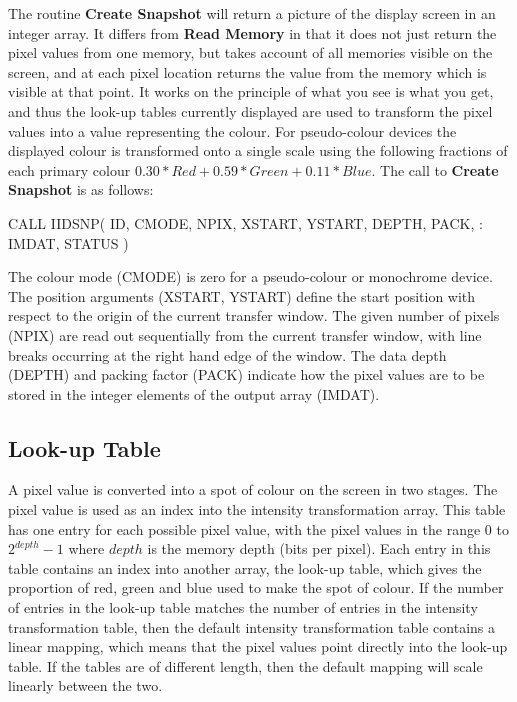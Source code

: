 \documentclass[11pt,nolof]{starlink}
\begin{document}
The routine \textbf{Create Snapshot} will return a picture of the display
screen in an integer array. It differs from \textbf{Read Memory} in that it
does not just return the pixel values from one memory, but takes account
of all memories visible on the screen, and at each pixel location returns
the value from the memory which is visible at that point. It works on the
principle of what you see is what you get, and thus the look-up tables
currently displayed are used to transform the pixel values into a value
representing the colour. For pseudo-colour devices the displayed colour
is transformed onto a single scale using the following fractions of each
primary colour $ 0.30 * Red + 0.59 * Green + 0.11 * Blue $.
The call to \textbf{Create Snapshot} is as follows:
\begin{small}
\begin{terminalv}
      CALL IIDSNP( ID, CMODE, NPIX, XSTART, YSTART, DEPTH, PACK,
     :             IMDAT, STATUS )
\end{terminalv}
\end{small}
The colour mode (CMODE) is zero for a pseudo-colour or monochrome device.
The position arguments (XSTART, YSTART) define the start position
with respect to the origin of the current transfer window.
The given number of pixels (NPIX) are read out sequentially
from the current transfer window, with line breaks occurring at the
right hand edge of the window.
The data depth (DEPTH) and packing factor (PACK) indicate how
the pixel values are to be stored in the integer elements of the output
array (IMDAT).

\subsection{Look-up Table}

A pixel value is converted into a spot of colour on the screen in two
stages. The pixel value is used as an index into the intensity
transformation array. This table has one entry for each possible
pixel value, with the pixel values in the range 0 to $2^{depth}-1$
where $depth$ is the memory depth (bits per pixel). Each entry in
this table contains an index into another array, the look-up table,
which gives the proportion of red, green and blue used to make the
spot of colour. If the number of entries in the look-up table matches
the number of entries in the intensity transformation table, then the
default intensity transformation table contains a linear mapping, which
means that the pixel values point directly into the look-up table. If the
tables are of different length, then the default mapping will scale
linearly between the two.
\end{document}

